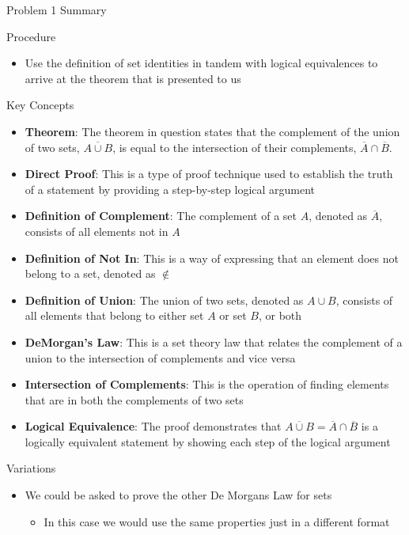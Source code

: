 \begin{summary}{Problem 1 Summary}
    \begin{statement}{Procedure}
        \begin{itemize}
            \item Use the definition of set identities in tandem with logical equivalences to arrive at the theorem that is presented to us
        \end{itemize}
    \end{statement}
    \begin{statement}{Key Concepts}
        \begin{itemize}
            \item \textbf{Theorem}: The theorem in question states that the complement of the union of two sets, $\overline{A \cup B}$, is equal to the intersection of their complements, 
            $\overline{A} \cap \overline{B}$.
            \item \textbf{Direct Proof}: This is a type of proof technique used to establish the truth of a statement by providing a step-by-step logical argument
            \item \textbf{Definition of Complement}: The complement of a set $A$, denoted as $\overline{A}$, consists of all elements not in $A$
            \item \textbf{Definition of Not In}: This is a way of expressing that an element does not belong to a set, denoted as $\notin$
            \item \textbf{Definition of Union}: The union of two sets, denoted as $A \cup B$, consists of all elements that belong to either set $A$ or set $B$, or both
            \item \textbf{DeMorgan’s Law}: This is a set theory law that relates the complement of a union to the intersection of complements and vice versa
            \item \textbf{Intersection of Complements}: This is the operation of finding elements that are in both the complements of two sets
            \item \textbf{Logical Equivalence}: The proof demonstrates that $\overline{A \cup B} = \overline{A} \cap \overline{B}$ is a logically equivalent statement by showing each step of the 
            logical argument
        \end{itemize}
    \end{statement}
    \begin{statement}{Variations}
        \begin{itemize}
            \item We could be asked to prove the other De Morgans Law for sets
            \begin{itemize}
                \item In this case we would use the same properties just in a different format
            \end{itemize}
        \end{itemize}
    \end{statement}
\end{summary}

